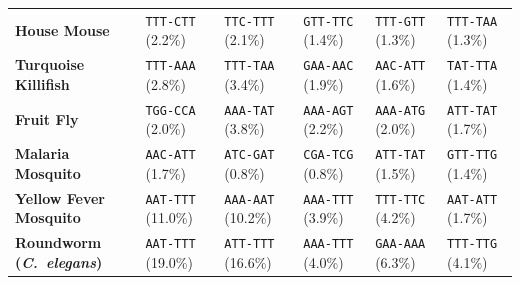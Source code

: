 \documentclass[11pt,a4paper]{article}
\renewcommand{\_}{\origunderscore\penalty200\relax}
\theoremstyle{remark}
\begin{document}
\begin{table}[H]
{{\begin{tabular}{llllll}
\textbf{House Mouse} & \texttt{TTT-CTT} (2.2\%) & \texttt{TTC-TTT} (2.1\%) & \texttt{GTT-TTC} (1.4\%) & \texttt{TTT-GTT} (1.3\%) & \texttt{TTT-TAA} (1.3\%) \\
\textbf{Turquoise Killifish} & \texttt{TTT-AAA} (2.8\%) & \texttt{TTT-TAA} (3.4\%) & \texttt{GAA-AAC} (1.9\%) & \texttt{AAC-ATT} (1.6\%) & \texttt{TAT-TTA} (1.4\%) \\
\textbf{Fruit Fly} & \texttt{TGG-CCA} (2.0\%) & \texttt{AAA-TAT} (3.8\%) & \texttt{AAA-AGT} (2.2\%) & \texttt{AAA-ATG} (2.0\%) & \texttt{ATT-TAT} (1.7\%) \\
\textbf{Malaria Mosquito} & \texttt{AAC-ATT} (1.7\%) & \texttt{ATC-GAT} (0.8\%) & \texttt{CGA-TCG} (0.8\%) & \texttt{ATT-TAT} (1.5\%) & \texttt{GTT-TTG} (1.4\%) \\
\textbf{Yellow Fever Mosquito} & \texttt{AAT-TTT} (11.0\%) & \texttt{AAA-AAT} (10.2\%) & \texttt{AAA-TTT} (3.9\%) & \texttt{TTT-TTC} (4.2\%) & \texttt{AAT-ATT} (1.7\%) \\
\textbf{Roundworm (\textit{C.\ elegans})} & \texttt{AAT-TTT} (19.0\%) & \texttt{ATT-TTT} (16.6\%) & \texttt{AAA-TTT} (4.0\%) & \texttt{GAA-AAA} (6.3\%) & \texttt{TTT-TTG} (4.1\%) \\
\bottomrule
\end{tabular}}}
\end{table}
\end{document}
